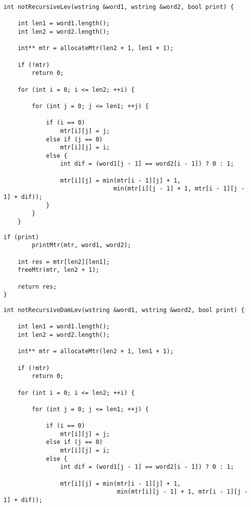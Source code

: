 \begin{lstlisting}[label=lst:lev_mtr,caption=Функция нахождения расстояния Левенштейна с использованием матрицы (начало)]
int notRecursiveLev(wstring &word1, wstring &word2, bool print) {
    
    int len1 = word1.length();
    int len2 = word2.length();

    int** mtr = allocateMtr(len2 + 1, len1 + 1);

    if (!mtr)
        return 0;

    for (int i = 0; i <= len2; ++i) {

        for (int j = 0; j <= len1; ++j) {

            if (i == 0)
                mtr[i][j] = j;
            else if (j == 0)
                mtr[i][j] = i;
            else {
                int dif = (word1[j - 1] == word2[i - 1]) ? 0 : 1;

                mtr[i][j] = min(mtr[i - 1][j] + 1, 
                               min(mtr[i][j - 1] + 1, mtr[i - 1][j - 1] + dif));
            }
        }
    }
\end{lstlisting}

\begin{lstlisting}[label=lst:lev_mtr,caption=Функция нахождения расстояния Левенштейна с использованием матрицы (окончание)]
    if (print)  
        printMtr(mtr, word1, word2);

    int res = mtr[len2][len1];
    freeMtr(mtr, len2 + 1);

    return res;
}
\end{lstlisting}

\begin{lstlisting}[label=lst:dameray_lev_rec,caption=Функция нахождения расстояния Дамерау-Левенштейна с использованием матрицы (начало)]
int notRecursiveDamLev(wstring &word1, wstring &word2, bool print) {

    int len1 = word1.length();
    int len2 = word2.length();

    int** mtr = allocateMtr(len2 + 1, len1 + 1);

    if (!mtr)
        return 0;

    for (int i = 0; i <= len2; ++i) {

        for (int j = 0; j <= len1; ++j) {

            if (i == 0)
                mtr[i][j] = j;
            else if (j == 0)
                mtr[i][j] = i;
            else {
                int dif = (word1[j - 1] == word2[i - 1]) ? 0 : 1;

                mtr[i][j] = min(mtr[i - 1][j] + 1, 
                                min(mtr[i][j - 1] + 1, mtr[i - 1][j - 1] + dif));

\end{lstlisting}

